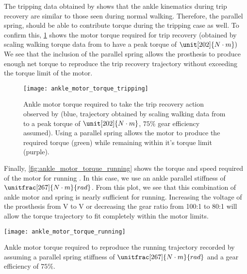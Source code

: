 The tripping data obtained by \citet{pijnappels2005early} shows that the ankle
kinematics during trip recovery are similar to those seen during normal walking.
Therefore, the parallel spring, should be able to contribute torque during the
tripping case as well. To confirm this, \cref{fig:ankle_motor_torque_tripping}
shows the motor torque required for trip recovery (obtained by scaling walking
torque data from \citet{winter2009biomechanics} to have a peak torque of
$\unit[202]{N \cdot m})$ We see that the inclusion of the parallel spring allows
the prosthesis to produce enough net torque to reproduce the trip recovery
trajectory without exceeding the torque limit of the motor. 
\begin{figure}[b]
    \centering 
    \texttt{[image: ankle\_motor\_torque\_tripping]}
    \caption[Ankle motor torque required to take the trip recovery action]{Ankle
    motor torque required to take the trip recovery action observed by
    \citet{pijnappels2005early} (blue, trajectory obtained by scaling walking
    data from \citet{winter2009biomechanics} to a peak torque of $\unit[202]{N
    \cdot m}$, $75\%$ gear efficiency assumed). Using a parallel spring allows
    the motor to produce the required torque (green) while remaining within it's
    torque limit (purple).  }\label{fig:ankle_motor_torque_tripping}
\end{figure}

Finally, \cref{fig:ankle_motor_torque_running} shows the torque and speed
required of the motor for running \citep{novacheck1998biomechanics}. In this
case, we use an ankle parallel stiffness of $\unitfrac[267]{N \cdot m}{rad}$.
From this plot, we see that this combination of ankle motor and spring is nearly
sufficient for running. Increasing the voltage of the prosthesis from
\unit[48]{V} to \unit[60]{V} or decreasing the gear ratio from 100:1 to 80:1
will allow the torque trajectory to fit completely within the motor limits. 
\begin{marginfigure}[-0in]
    \centering 
    \texttt{[image: ankle\_motor\_torque\_running]}
    \caption[Ankle motor torque required to reproduce a running
    trajectory]{Ankle motor torque required to reproduce the running trajectory
    recorded by \citet{novacheck1998biomechanics} assuming a parallel spring
    stiffness of $\unitfrac[267]{N \cdot m}{rad}$ and a gear efficiency of
    $75\%$.}\label{fig:ankle_motor_torque_running}
\end{marginfigure}


